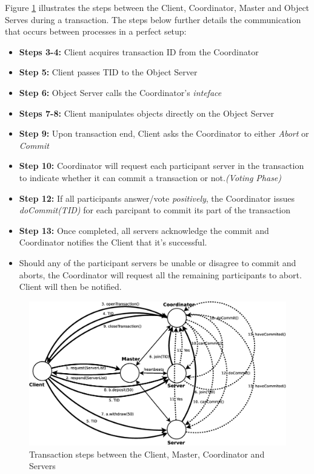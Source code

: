 \documentclass[times, 10pt,twocolumn]{article}
\begin{document}
Figure \ref{fig:transa} illustrates the steps between the Client, Coordinator, Master and Object Serves during a transaction. The steps below further details the communication that occurs between processes in a perfect setup: 

\begin{itemize}[noitemsep, nolistsep]
\item {\bf Steps 3-4:} Client acquires transaction ID from the Coordinator 
\item {\bf Step 5:} Client passes TID to the Object Server
\item {\bf Step 6:} Object Server calls the Coordinator's {\it inteface}
\item {\bf Steps 7-8:} Client manipulates objects directly on the Object Server
\item {\bf Step 9:} Upon transaction end, Client asks the Coordinator to either {\it Abort} or {\it Commit} 
\item {\bf Step 10:} Coordinator will request each participant server in the transaction to indicate whether it can commit a transaction or not.{\it (Voting Phase)}
\item {\bf Step 12:} If all participants answer/vote {\it positively}, the Coordinator issues {\it doCommit(TID)} for each parcipant to commit its part of the transaction
\item {\bf Step 13:} Once completed, all servers acknowledge the commit and Coordinator notifies the Client that it's successful.
\item Should any of the participant servers be unable or disagree to commit and aborts, the Coordinator will request all the remaining participants to abort. Client will then be notified.
\end{itemize}

\begin{figure}
\centering
\includegraphics[scale=0.2]{transaction.eps}
\caption{Transaction steps between the Client, Master, Coordinator and Servers}
\label{fig:transa}
\end{figure}
\end{document}
